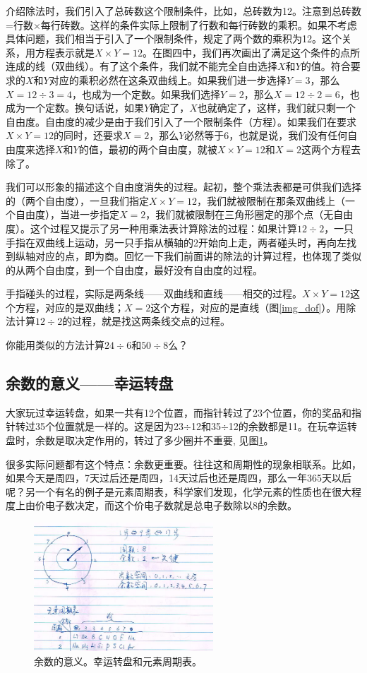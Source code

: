 介绍除法时，我们引入了总砖数这个限制条件，比如，总砖数为12。注意到总砖数=行数$\times$每行砖数。这样的条件实际上限制了行数和每行砖数的乘积。如果不考虑具体问题，我们相当于引入了一个限制条件，规定了两个数的乘积为12。这个关系，用方程表示就是$X\times Y = 12$。在图四中，我们再次画出了满足这个条件的点所连成的线（双曲线）。有了这个条件，我们就不能完全自由选择$X$和$Y$的值。符合要求的$X$和$Y$对应的乘积必然在这条双曲线上。如果我们进一步选择$Y=3$，那么$X=12\div3=4$，也成为一个定数。如果我们选择$Y=2$，那么$X=12\div2=6$，也成为一个定数。换句话说，如果$Y$确定了，$X$也就确定了，这样，我们就只剩一个自由度。自由度的减少是由于我们引入了一个限制条件（方程）。如果我们在要求$X\times Y = 12$的同时，还要求$X=2$，那么$Y$必然等于6，也就是说，我们没有任何自由度来选择$X$和$Y$的值，最初的两个自由度，就被$X\times Y = 12$和$X=2$这两个方程去除了。

我们可以形象的描述这个自由度消失的过程。起初，整个乘法表都是可供我们选择的（两个自由度），一旦我们指定$X\times Y = 12$，我们就被限制在那条双曲线上（一个自由度），当进一步指定$X=2$，我们就被限制在三角形圈定的那个点（无自由度）。这个过程又提示了另一种用乘法表计算除法的过程：如果计算$12\div2$，一只手指在双曲线上运动，另一只手指从横轴的2开始向上走，两者碰头时，再向左找到纵轴对应的点，即为商。回忆一下我们前面讲的除法的计算过程，也体现了类似的从两个自由度，到一个自由度，最好没有自由度的过程。

手指碰头的过程，实际是两条线——双曲线和直线——相交的过程。$X\times Y = 12$这个方程，对应的是双曲线；$X = 2$这个方程，对应的是直线（图\ref{img_dof}）。用除法计算$12\div2$的过程，就是找这两条线交点的过程。

你能用类似的方法计算$24\div6$和$50\div8$么？

\subsection{余数的意义——幸运转盘} 大家玩过幸运转盘，如果一共有12个位置，而指针转过了23个位置，你的奖品和指针转过35个位置就是一样的。这是因为23$\div$12和35$\div$12的余数都是11。在玩幸运转盘时，余数是取决定作用的，转过了多少圈并不重要, 见图\ref{img_wheel}。 

    很多实际问题都有这个特点：余数更重要。往往这和周期性的现象相联系。比如，如果今天是周四，7天过后还是周四，14天过后也还是周四，那么一年365天以后呢？另一个有名的例子是元素周期表，科学家们发现，化学元素的性质也在很大程度上由价电子数决定，而这个价电子数就是总电子数除以8的余数。
\begin{figure}[h]
     \center
     \includegraphics[width=0.6\textwidth]{division_res/wheel}
     \caption{余数的意义。幸运转盘和元素周期表。}
     \label{img_wheel}
\end{figure}

